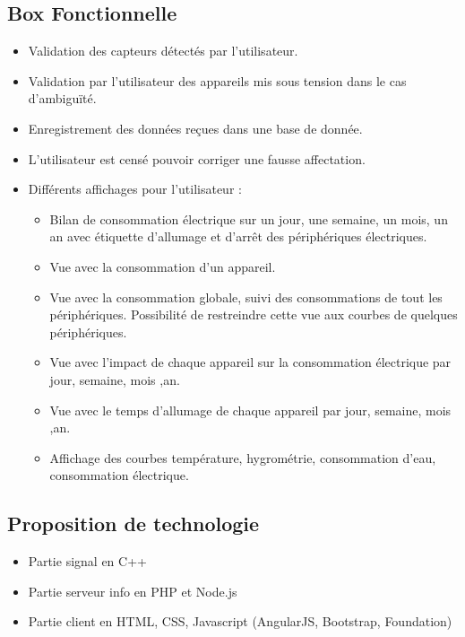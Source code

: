 \documentclass[10pt,a4paper]{article}
\begin{document}
\subsection{Box Fonctionnelle}
\begin{itemize}
  \item Validation des capteurs détectés par l'utilisateur.
  \item Validation par l'utilisateur des appareils mis sous tension dans le cas d'ambiguïté.
  \item Enregistrement des données reçues dans une base de donnée.
  \item L'utilisateur est censé pouvoir corriger une fausse affectation.
  \item Différents affichages pour l'utilisateur :
  \begin{itemize}
    \item Bilan de consommation électrique sur un jour, une semaine, un mois, un an avec étiquette d'allumage et d'arrêt des périphériques électriques.
    \item Vue avec la consommation d'un appareil.
    \item Vue avec la consommation globale, suivi des consommations de tout les périphériques. Possibilité de restreindre cette vue aux courbes de quelques périphériques.
    \item Vue avec l'impact de chaque appareil sur la consommation électrique par jour, semaine, mois ,an.
    \item Vue avec le temps d'allumage de chaque appareil par jour, semaine, mois ,an.
    \item Affichage des courbes température, hygrométrie, consommation d'eau, consommation électrique.
  \end{itemize}
\end{itemize}
\subsection{Proposition de technologie}
\begin{itemize}
\item Partie signal en C++
\item Partie serveur info en PHP et Node.js
\item Partie client en HTML, CSS, Javascript (AngularJS, Bootstrap, Foundation)
\end{itemize}
\end{document}
